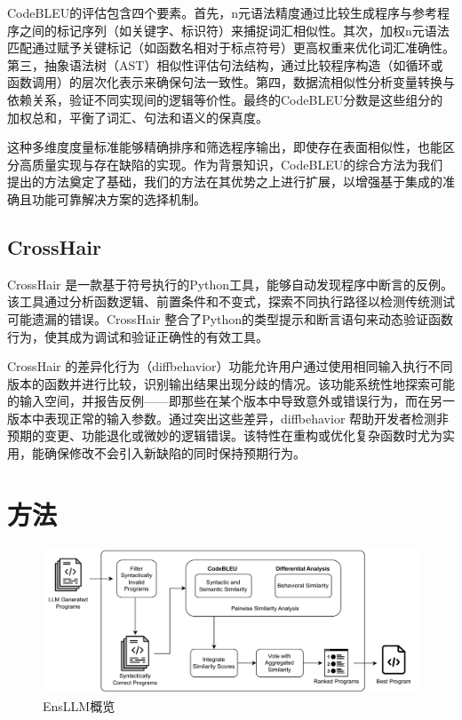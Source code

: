 \documentclass{article}
\newcommand{\tool}{EnsLLM}
\begin{document}
\begin{CJK*}{UTF8}{gbsn}
CodeBLEU的评估包含四个要素。首先，n元语法精度通过比较生成程序与参考程序之间的标记序列（如关键字、标识符）来捕捉词汇相似性。其次，加权n元语法匹配通过赋予关键标记（如函数名相对于标点符号）更高权重来优化词汇准确性。第三，抽象语法树（AST）相似性评估句法结构，通过比较程序构造（如循环或函数调用）的层次化表示来确保句法一致性。第四，数据流相似性分析变量转换与依赖关系，验证不同实现间的逻辑等价性。最终的CodeBLEU分数是这些组分的加权总和，平衡了词汇、句法和语义的保真度。

这种多维度度量标准能够精确排序和筛选程序输出，即使存在表面相似性，也能区分高质量实现与存在缺陷的实现。作为背景知识，CodeBLEU的综合方法为我们提出的方法奠定了基础，我们的方法在其优势之上进行扩展，以增强基于集成的准确且功能可靠解决方案的选择机制。
\subsection{CrossHair}
CrossHair \cite{crosshair} 是一款基于符号执行的Python工具，能够自动发现程序中断言的反例。该工具通过分析函数逻辑、前置条件和不变式，探索不同执行路径以检测传统测试可能遗漏的错误。CrossHair 整合了Python的类型提示和断言语句来动态验证函数行为，使其成为调试和验证正确性的有效工具。

CrossHair 的差异化行为（diffbehavior）功能允许用户通过使用相同输入执行不同版本的函数并进行比较，识别输出结果出现分歧的情况。该功能系统性地探索可能的输入空间，并报告反例——即那些在某个版本中导致意外或错误行为，而在另一版本中表现正常的输入参数。通过突出这些差异，diffbehavior 帮助开发者检测非预期的变更、功能退化或微妙的逻辑错误。该特性在重构或优化复杂函数时尤为实用，能确保修改不会引入新缺陷的同时保持预期行为。
\section{方法}

\begin{figure}[t!]
    \centering
    \includegraphics[width=\linewidth]{figure/EnsembledLLM.pdf}
    \caption{\tool 概览}
    \label{fig:overview}
\end{figure}


\end{CJK*}
\end{document}
